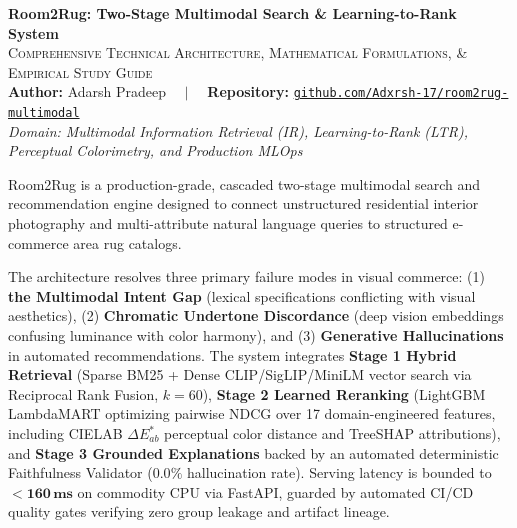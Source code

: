 \documentclass[11pt,a4paper]{article}
\begin{document}
\begin{center}
    {\Huge \textbf{\color{NavyDark}Room2Rug: Two-Stage Multimodal Search \& Learning-to-Rank System}}\\[0.8em]
    {\Large \textsc{\color{SlateDark}Comprehensive Technical Architecture, Mathematical Formulations, \& Empirical Study Guide}}\\[0.8em]
    \textbf{Author:} Adarsh Pradeep $\quad\vert\quad$ \textbf{Repository:} \href{https://github.com/Adxrsh-17/room2rug-multimodal}{\texttt{github.com/Adxrsh-17/room2rug-multimodal}}\\[0.4em]
    \small{\textit{Domain: Multimodal Information Retrieval (IR), Learning-to-Rank (LTR), Perceptual Colorimetry, and Production MLOps}}
\end{center}
\vspace{1.5em}

\begin{tcolorbox}[colback=BoxBg, colframe=AccentBlue, arc=4mm, title=\textbf{Executive Technical Abstract}]
Room2Rug is a production-grade, cascaded two-stage multimodal search and recommendation engine designed to connect unstructured residential interior photography and multi-attribute natural language queries to structured e-commerce area rug catalogs. 

The architecture resolves three primary failure modes in visual commerce: (1) \textbf{the Multimodal Intent Gap} (lexical specifications conflicting with visual aesthetics), (2) \textbf{Chromatic Undertone Discordance} (deep vision embeddings confusing luminance with color harmony), and (3) \textbf{Generative Hallucinations} in automated recommendations. The system integrates \textbf{Stage 1 Hybrid Retrieval} (Sparse BM25 + Dense CLIP/SigLIP/MiniLM vector search via Reciprocal Rank Fusion, $k=60$), \textbf{Stage 2 Learned Reranking} (LightGBM LambdaMART optimizing pairwise NDCG over 17 domain-engineered features, including CIELAB $\Delta E^*_{ab}$ perceptual color distance and TreeSHAP attributions), and \textbf{Stage 3 Grounded Explanations} backed by an automated deterministic Faithfulness Validator ($0.0\%$ hallucination rate). Serving latency is bounded to $\mathbf{< 160\,\text{ms}}$ on commodity CPU via FastAPI, guarded by automated CI/CD quality gates verifying zero group leakage and artifact lineage.
\end{tcolorbox}
\end{document}
